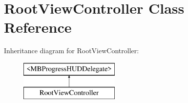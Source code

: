 \hypertarget{interface_root_view_controller}{
\section{RootViewController Class Reference}
\label{interface_root_view_controller}
}
Inheritance diagram for RootViewController:\begin{figure}[H]
\begin{center}
\leavevmode
\includegraphics[height=2.000000cm]{interface_root_view_controller}
\end{center}
\end{figure}
